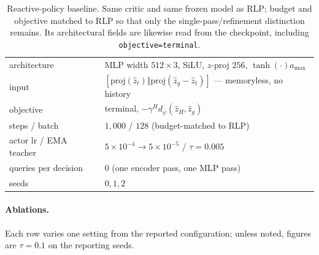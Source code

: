 \begin{table}[h]
\centering\small
\caption{Reactive-policy baseline. Same critic and same frozen model as RLP;
budget and objective matched to RLP so that only the single-pass/refinement
distinction remains. Its architectural fields are likewise read from the
checkpoint, including \texttt{objective=terminal}.}
\begin{tabular}{ll}
\toprule
architecture & MLP width $512\times3$, SiLU, $z$-proj $256$, $\tanh(\cdot)a_{\max}$ \\
input & $[\mathrm{proj}(\hat z_t) \Vert \mathrm{proj}(\hat z_g - \hat z_t)]$ --- memoryless, no history \\
objective & terminal, $-\gamma^{H} d_{\bar\psi}(\hat z_H, \hat z_g)$ \\
steps / batch & $1{,}000$ / $128$ (budget-matched to RLP) \\
actor lr / EMA teacher & $5\!\times\!10^{-4}\!\to\!5\!\times\!10^{-5}$ / $\tau = 0.005$ \\
queries per decision & $0$ (one encoder pass, one MLP pass) \\
seeds & $0,1,2$ \\
\bottomrule
\end{tabular}
\end{table}

\paragraph{Ablations.}
Each row varies one setting from the reported configuration; unless noted,
figures are $\tau = 0.1$ on the reporting seeds.

